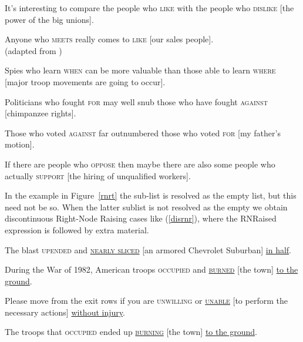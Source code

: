 \documentclass[output=paper
                ,modfonts
                ,nonflat
	        ,collection
	        ,collectionchapter
	        ,collectiontoclongg
 	        ,biblatex
                ,babelshorthands
                ,newtxmath
                ,draftmode
                ,colorlinks, citecolor=brown
]{./langsci/langscibook}
\begin{document}
\begin{exe}
\ex \begin{xlista}
\ex  It's interesting to compare the people who \textsc{like} with the people
       who \textsc{dislike} [the power of the big unions].\\
       \citep[550]{hudson}

 \ex Anyone  who \textsc{meets} really comes to \textsc{like} [our sales people].\\
 (adapted from \citet{
williams})\label{will}


\ex   Spies who learn \textsc{when} can be more valuable than those
able to learn \textsc{where} [major troop movements are going to occur].

\ex Politicians who fought \textsc{for} may well snub those
 who have fought \textsc{against} [chimpanzee rights]. \\
\citep{postal94}

\ex Those who voted \textsc{against} far outnumbered those who
voted  \textsc{for} [my father's motion].\\
\citep[1344]{rodney2}


\ex If there are people who \textsc{oppose} then maybe there are also some
  people who actually \textsc{support}  [the hiring of unqualified
  workers].\\
  \citep{chavesrnr}

\end{xlista}


\end{exe}




In the example in Figure~\ref{rnrt}  the sub-list  is resolved as the empty list, but this need not be so. When the latter sublist is not resolved as the empty we obtain discontinuous Right-Node Raising cases like (\ref{disrnr}), 
where the RNRaised expression is followed by extra material.


\begin{exe}
\ex \begin{xlista}
\ex The blast \textsc{upended} and \underline{\textsc{nearly sliced}} [an armored Chevrolet Suburban] \underline{in half}.

\ex During the War of 1982, American troops
\textsc{occupied}  and \underline{\textsc{burned}} [the town] \underline{to the ground}.

\ex Please move from the exit rows if you are \textsc{unwilling} or \underline{\textsc{unable}}
 [to perform the necessary actions] \underline{without injury}.

\ex The troops that \textsc{occupied} ended up \underline{\textsc{burning}}
[the town] \underline{to the ground}.

\end{xlista}\label{disrnr}
\end{exe}
\end{document}
